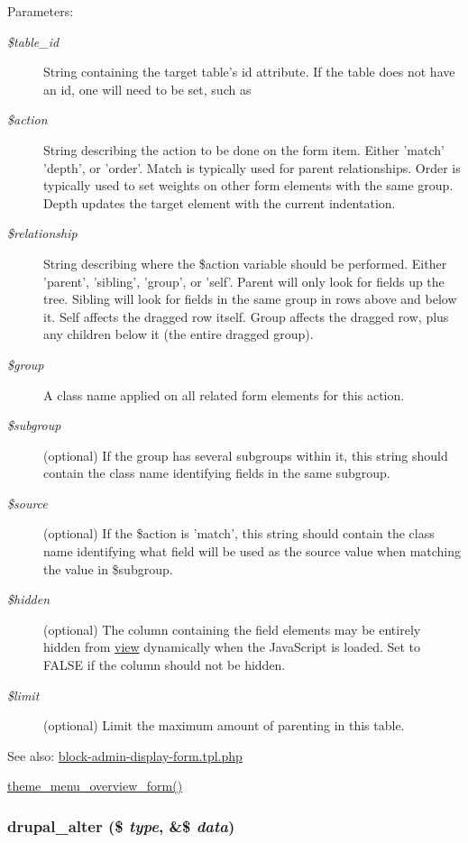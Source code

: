 \begin{Desc}
\item[Parameters:]
\begin{description}
\item[{\em \$table\_\-id}]String containing the target table's id attribute. If the table does not have an id, one will need to be set, such as \begin{TabularC}{0}
\hline
\end{TabularC}
\item[{\em \$action}]String describing the action to be done on the form item. Either 'match' 'depth', or 'order'. Match is typically used for parent relationships. Order is typically used to set weights on other form elements with the same group. Depth updates the target element with the current indentation. \item[{\em \$relationship}]String describing where the \$action variable should be performed. Either 'parent', 'sibling', 'group', or 'self'. Parent will only look for fields up the tree. Sibling will look for fields in the same group in rows above and below it. Self affects the dragged row itself. Group affects the dragged row, plus any children below it (the entire dragged group). \item[{\em \$group}]A class name applied on all related form elements for this action. \item[{\em \$subgroup}](optional) If the group has several subgroups within it, this string should contain the class name identifying fields in the same subgroup. \item[{\em \$source}](optional) If the \$action is 'match', this string should contain the class name identifying what field will be used as the source value when matching the value in \$subgroup. \item[{\em \$hidden}](optional) The column containing the field elements may be entirely hidden from \hyperlink{classview}{view} dynamically when the JavaScript is loaded. Set to FALSE if the column should not be hidden. \item[{\em \$limit}](optional) Limit the maximum amount of parenting in this table. \end{description}
\end{Desc}
\begin{Desc}
\item[See also:]\hyperlink{block-admin-display-form_8tpl_8php}{block-admin-display-form.tpl.php} 

\hyperlink{group__themeable_g4af0d13e1a7fdd7c08283101bbed6d2c}{theme\_\-menu\_\-overview\_\-form()} \end{Desc}
\hypertarget{common_8inc_d41a0d489123ca5b04976d9a3d7e11d4}{
\subsubsection[{drupal\_\-alter}]{\setlength{\rightskip}{0pt plus 5cm}drupal\_\-alter (\$ {\em type}, \/  \&\$ {\em data})}}
\label{common_8inc_d41a0d489123ca5b04976d9a3d7e11d4}


